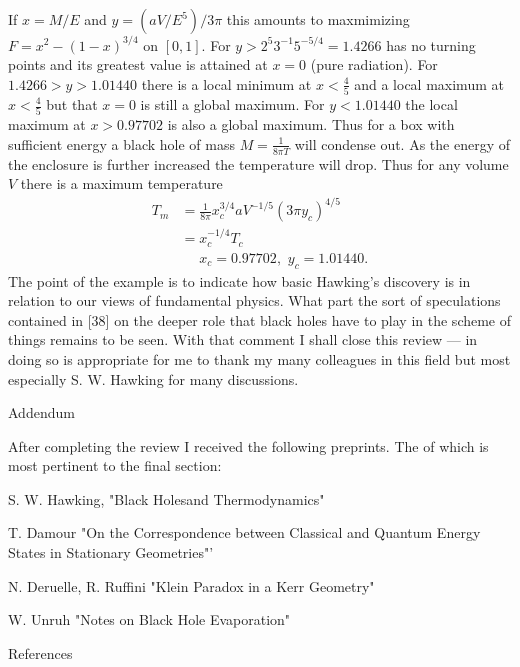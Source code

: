 If $x = M/E$ and $y = (aV/E^5)/3\pi$ this amounts to maxmimizing $F = x^2 - (1-x)^{3/4}$
on $[0,1]$. For $y > {2^5}{3^{-1}} 5^{-5/4} = 1.4266$ has no turning points and its greatest
value is attained at $x=0$ (pure radiation). For $1.4266 > y > 1.01440$ there is a
local minimum at $x < \frac{4}{5}$ and a local maximum at $x < \frac{4}{5}$ but 
that $x = 0$ is still a global maximum. For $y< 1.01440$ the local maximum at $x > 0.97702$
is also a global maximum.
Thus for a box with sufficient energy a black hole of
mass $M = \frac{1}{8\pi T}$ will condense out.
As the energy of the enclosure is further increased the temperature will drop.
Thus for any volume $V$ there is a maximum temperature 
\begin{align*}
T_m &= \frac{1}{8\pi}x_c^{3/4}aV^{-1/5}(3\pi y_c)^{4/5}\\
& = x_c^{-1/4} T_c \\
&  \,\,\quad x_c = 0.97702, \,\, y_c = 1.01440.
\end{align*}
The point of the example is to indicate how basic Hawking's discovery is
in relation to our views of fundamental physics. 
What part the sort of speculations contained in [38] on the deeper
role that black holes have to play in the
scheme of things remains to be seen. With that comment I shall close this review
--- in doing so is appropriate for me to thank my many colleagues in this field
but most especially S. W. Hawking for many discussions.


\bigskip
\centerline{\sc Addendum}
\bigskip

After completing the review I received the following preprints. The
of which is most pertinent to the final section:

\bigskip

S. W. Hawking, "Black Holesand Thermodynamics"

T. Damour "On the Correspondence between Classical and Quantum Energy
States in Stationary Geometries"'

N. Deruelle, R. Ruffini "Klein Paradox in a Kerr Geometry"

W. Unruh "Notes on Black Hole Evaporation"

\newpage

\renewcommand{\section}[2]{}%

\bigskip
\bigskip
\centerline{\sc References}

